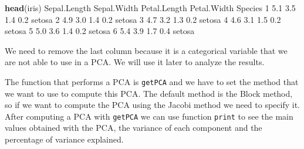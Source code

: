 \documentclass[]{article}
\newenvironment{Shaded}{\begin{snugshade}}{\end{snugshade}}
\newcommand{\KeywordTok}[1]{\textcolor[rgb]{0.13,0.29,0.53}{\textbf{#1}}}
\newcommand{\DecValTok}[1]{\textcolor[rgb]{0.00,0.00,0.81}{#1}}
\newcommand{\FloatTok}[1]{\textcolor[rgb]{0.00,0.00,0.81}{#1}}
\newcommand{\StringTok}[1]{\textcolor[rgb]{0.31,0.60,0.02}{#1}}
\newcommand{\OperatorTok}[1]{\textcolor[rgb]{0.81,0.36,0.00}{\textbf{#1}}}
\newcommand{\NormalTok}[1]{#1}
\begin{document}
\begin{Shaded}
\begin{Highlighting}[]
\KeywordTok{head}\NormalTok{(iris)}
\NormalTok{  Sepal.Length Sepal.Width Petal.Length Petal.Width Species}
\DecValTok{1}          \FloatTok{5.1}         \FloatTok{3.5}          \FloatTok{1.4}         \FloatTok{0.2}\NormalTok{  setosa}
\DecValTok{2}          \FloatTok{4.9}         \FloatTok{3.0}          \FloatTok{1.4}         \FloatTok{0.2}\NormalTok{  setosa}
\DecValTok{3}          \FloatTok{4.7}         \FloatTok{3.2}          \FloatTok{1.3}         \FloatTok{0.2}\NormalTok{  setosa}
\DecValTok{4}          \FloatTok{4.6}         \FloatTok{3.1}          \FloatTok{1.5}         \FloatTok{0.2}\NormalTok{  setosa}
\DecValTok{5}          \FloatTok{5.0}         \FloatTok{3.6}          \FloatTok{1.4}         \FloatTok{0.2}\NormalTok{  setosa}
\DecValTok{6}          \FloatTok{5.4}         \FloatTok{3.9}          \FloatTok{1.7}         \FloatTok{0.4}\NormalTok{  setosa}
\end{Highlighting}
\end{Shaded}

We need to remove the last column because it is a categorical variable
that we are not able to use in a PCA. We will use it later to analyze
the results.

\begin{Shaded}
\end{Shaded}

The function that performs a PCA is \texttt{getPCA} and we have to set
the method that we want to use to compute this PCA. The default method
is the Block method, so if we want to compute the PCA using the Jacobi
method we need to specify it. After computing a PCA with \texttt{getPCA}
we can use function \texttt{print} to see the main values obtained with
the PCA, the variance of each component and the percentage of variance
explained.
\end{document}
